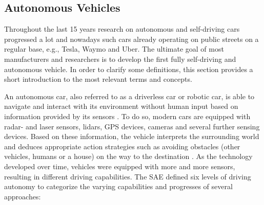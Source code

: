 \documentclass{llncs}
\begin{document}
{		%
		
		\subsection{Autonomous Vehicles}
			\label{ss:autonomous-vehicles}
			
			Throughout the last 15 years research on autonomous and self-driving cars progressed a lot and nowadays such cars already operating on public streets on a regular base, e.g., Tesla, Waymo and Uber. The ultimate goal of most manufacturers and researchers is to develop the first fully self-driving and autonomous vehicle. In order to clarify some definitions, this section provides a short introduction to the most relevant terms and concepts.

			An autonomous car, also referred to as a driverless car or robotic car, is able to navigate and interact with its environment without human input based on information provided by its sensors \cite{gehrig1999dead}\cite{thrun2010toward}. To do so, modern cars are equipped with radar- and laser sensors, lidars, GPS devices, cameras and several further sensing devices. Based on these information, the vehicle interprets the surrounding world and deduces appropriate action strategies such as avoiding obstacles (other vehicles, humans or a house) on the way to the destination \cite{dokic2015european}\cite{zhu2014vehicle}. As the technology developed over time, vehicles were equipped with more and more sensors, resulting in different driving capabilities. The SAE \cite{autonomyLevelsSAE}
			defined six levels of driving autonomy to categorize the varying capabilities and progresses of several approaches:		
			
}
\end{document}
